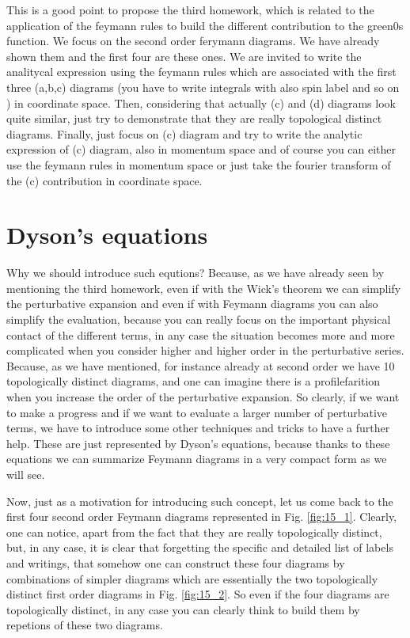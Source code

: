 \documentclass[../main/main.tex]{subfiles}
\begin{document}
This is a good point to propose the third homework, which is related to the application of the feymann rules to build the different contribution to the green0s function. We focus on the second order ferymann diagrams. We have already shown them and the first four are these ones. We are invited to write the analitycal expression using the feymann rules which are associated with the first three (a,b,c) diagrams (you have to write integrals with also spin label and so on ) in coordinate space. Then, considering that actually
(c) and (d) diagrams look quite similar, just try to demonstrate that they are really topological distinct diagrams. Finally, just focus on (c) diagram and try to write the analytic expression of (c) diagram, also in momentum space and of course you can either use the feymann rules in momentum space or just take the fourier transform of the (c) contribution in coordinate space.



\section{Dyson's equations}
Why we should introduce such equtions? Because, as we have already seen by mentioning the third homework, even if with the Wick's theorem we can simplify the perturbative expansion and even if with Feymann diagrams you can also simplify the evaluation, because you can really focus on the important physical contact of the different terms, in any case the situation becomes more and more complicated when you consider higher and higher order in the perturbative series. Because, as we have mentioned, for instance already at second order we have 10 topologically distinct diagrams, and one can imagine there is a profilefarition when you increase the order of the perturbative expansion. So clearly, if we want to make a progress and if we want to evaluate a larger number of perturbative terms, we have to introduce some other techniques and tricks to have a further help. These are just represented by Dyson's equations, because thanks to these equations we can summarize Feymann diagrams in a very compact form as we will see.

Now, just as a motivation for introducing such concept, let us come back to the first four second order Feymann diagrams represented in Fig. \ref{fig:15_1}.
Clearly, one can notice, apart from the fact that they are really topologically distinct, but, in any case, it is clear that forgetting the specific and detailed list of labels and writings, that somehow one can construct these four diagrams by combinations of simpler diagrams which are essentially the two topologically distinct first order diagrams in Fig. \ref{fig:15_2}. So even if the four diagrams are topologically distinct, in any case you can clearly think to build them by repetions of these two diagrams.
\end{document}
